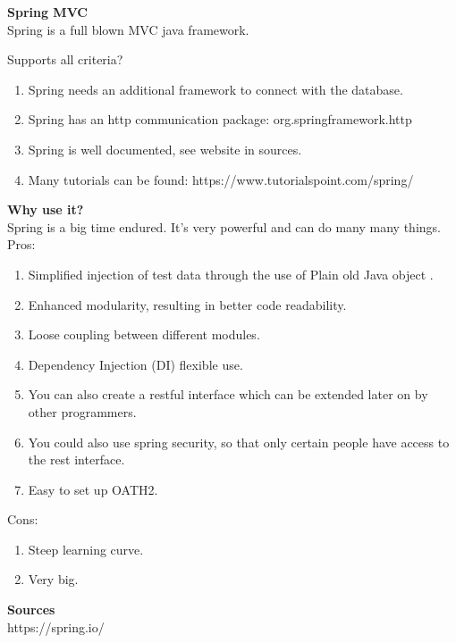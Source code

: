 \textbf{Spring MVC} \\
Spring is a full blown MVC java framework.

Supports all criteria? \\
\begin{enumerate}
	\item Spring needs an additional framework to connect with the database.
	\item Spring has an http communication package: org.springframework.http
	\item Spring is well documented, see website in sources.
	\item Many tutorials can be found: https://www.tutorialspoint.com/spring/
\end{enumerate}

\textbf{Why use it?}\\
Spring is a big time endured. It's very powerful and can do many many things.\\

Pros:
\begin{enumerate}
	\item Simplified injection of test data through the use of Plain old Java object .
	\item Enhanced modularity, resulting in better code readability.
	\item Loose coupling between different modules.
	\item Dependency Injection (DI) flexible use.
	\item You can also create a restful interface which can be extended later on by other programmers.
	\item You could also use spring security, so that only certain people have access to the rest interface.
	\item Easy to set up OATH2. 
\end{enumerate}
Cons:
\begin{enumerate}
	\item Steep learning curve.
	\item Very big.
\end{enumerate}

\textbf{Sources}\\
https://spring.io/